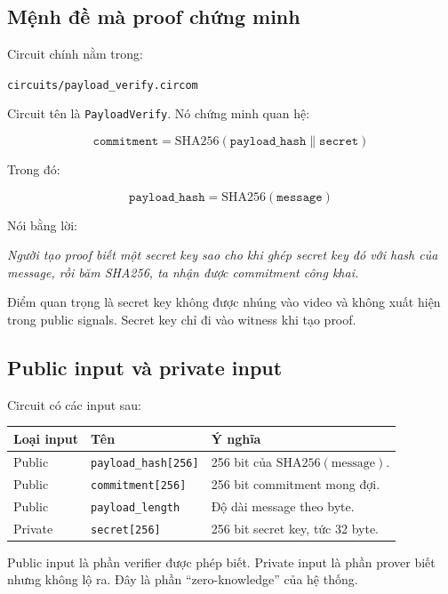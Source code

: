 \documentclass[11pt,a4paper]{article}
\begin{document}
\subsection{Mệnh đề mà proof chứng minh}

Circuit chính nằm trong:

\begin{center}
\texttt{circuits/payload\_verify.circom}
\end{center}

Circuit tên là \texttt{PayloadVerify}. Nó chứng minh quan hệ:

\[
  \texttt{commitment}
  =
  \mathrm{SHA256}(\texttt{payload\_hash} \parallel \texttt{secret})
\]

Trong đó:

\[
  \texttt{payload\_hash}
  =
  \mathrm{SHA256}(\texttt{message})
\]

Nói bằng lời:

\begin{center}
\textit{Người tạo proof biết một secret key sao cho khi ghép secret key đó với
hash của message, rồi băm SHA256, ta nhận được commitment công khai.}
\end{center}

Điểm quan trọng là secret key không được nhúng vào video và không xuất hiện
trong public signals. Secret key chỉ đi vào witness khi tạo proof.

\subsection{Public input và private input}

Circuit có các input sau:

\begin{center}
\begin{tabular}{lll}
\toprule
Loại input & Tên & Ý nghĩa \\
\midrule
Public & \texttt{payload\_hash[256]} & 256 bit của \(\mathrm{SHA256(message)}\). \\
Public & \texttt{commitment[256]} & 256 bit commitment mong đợi. \\
Public & \texttt{payload\_length} & Độ dài message theo byte. \\
Private & \texttt{secret[256]} & 256 bit secret key, tức 32 byte. \\
\bottomrule
\end{tabular}
\end{center}

Public input là phần verifier được phép biết. Private input là phần prover biết
nhưng không lộ ra. Đây là phần ``zero-knowledge'' của hệ thống.
\end{document}
